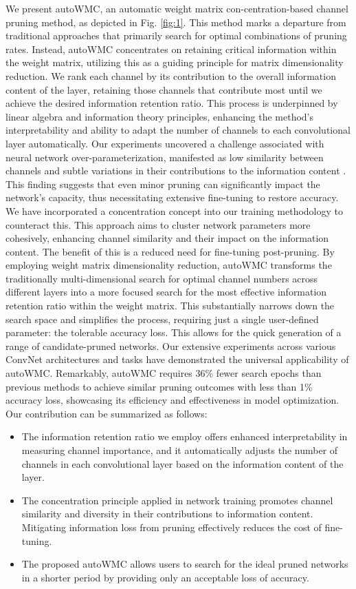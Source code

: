 \documentclass[sigconf, 10pt]{acmart}
\begin{document}
We present autoWMC, an automatic weight matrix con-centration-based channel pruning method, as depicted in Fig. \ref{fig:1}. This method marks a departure from traditional approaches that primarily search for optimal combinations of pruning rates. Instead, autoWMC concentrates on retaining critical information within the weight matrix, utilizing this as a guiding principle for matrix dimensionality reduction. We rank each channel by its contribution to the overall information content of the layer, retaining those channels that contribute most until we achieve the desired information retention ratio. This process is underpinned by linear algebra and information theory principles, enhancing the method's interpretability and ability to adapt the number of channels to each convolutional layer automatically. Our experiments uncovered a challenge associated with neural network over-parameterization, manifested as low similarity between channels and subtle variations in their contributions to the information content \cite{frankle2018lottery,ye2020channel,tzelepis2019deep}. This finding suggests that even minor pruning can significantly impact the network's capacity, thus necessitating extensive fine-tuning to restore accuracy. We have incorporated a concentration concept \cite{35} into our training methodology to counteract this. This approach aims to cluster network parameters more cohesively, enhancing channel similarity and their impact on the information content. The benefit of this is a reduced need for fine-tuning post-pruning. By employing weight matrix dimensionality reduction, autoWMC transforms the traditionally multi-dimensional search for optimal channel numbers across different layers into a more focused search for the most effective information retention ratio within the weight matrix. This substantially narrows down the search space and simplifies the process, requiring just a single user-defined parameter: the tolerable accuracy loss. This allows for the quick generation of a range of candidate-pruned networks. Our extensive experiments across various ConvNet architectures and tasks have demonstrated the universal applicability of autoWMC. Remarkably, autoWMC requires 36\% fewer search epochs than previous methods to achieve similar pruning outcomes with less than 1\% accuracy loss, showcasing its efficiency and effectiveness in model optimization. Our contribution can be summarized as follows:

\begin{itemize}
    \item The information retention ratio we employ offers enhanced interpretability in measuring channel importance, and it automatically adjusts the number of channels in each convolutional layer based on the information content of the layer.
    \item The concentration principle applied in network training promotes channel similarity and diversity in their contributions to information content. Mitigating information loss from pruning effectively reduces the cost of fine-tuning.
    \item The proposed autoWMC allows users to search for the ideal pruned networks in a shorter period by providing only an acceptable loss of accuracy.
\end{itemize}
\end{document}
